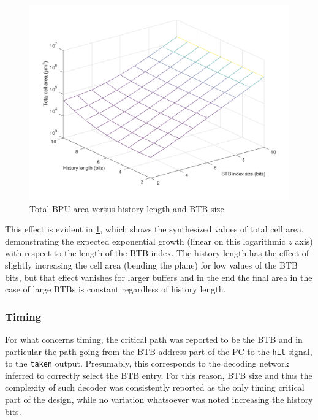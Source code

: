 \begin{figure}[hbt]
  \centering
  \includegraphics[width=\textwidth]{img/bpu_area.pdf}
  \caption{Total \acs{BPU} area versus history length and \ac{BTB} size}
  \label{fig:bpu_area}
\end{figure}
This effect is evident in \cref{fig:bpu_area}, which shows the synthesized values of total cell area, demonstrating the expected exponential growth (linear on this logarithmic $z$ axis) with respect to the length of the \ac{BTB} index. The history length has the effect of slightly increasing the cell area (bending the plane) for low values of the \ac{BTB} bits, but that effect vanishes for larger buffers and in the end the final area in the case of large \acp{BTB} is constant regardless of history length.

\subsubsection{Timing}
For what concerns timing, the critical path was reported to be the \ac{BTB} and in particular the path going from the \ac{BTB} address part of the \ac{PC} to the \texttt{hit} signal, to the \texttt{taken} output. Presumably, this corresponds to the decoding network inferred to correctly select the \ac{BTB} entry. For this reason, \ac{BTB} size and thus the complexity of such decoder was consistently reported as the only timing critical part of the design, while no variation whatsoever was noted increasing the history bits.

